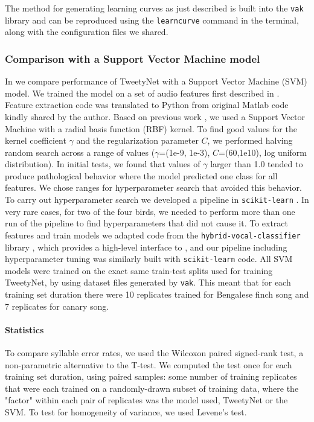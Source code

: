 \documentclass[9pt,lineno]{elife}
\begin{document}
The method for generating learning curves as just described is built into the \texttt{vak} library and 
can be reproduced using the \texttt{learncurve} command in the terminal, along with the configuration files we shared.

\subsubsection{Comparison with a Support Vector Machine model}
\label{methods:svm}
In  we compare performance of TweetyNet with a Support Vector Machine (SVM) model.
We trained the model on a set of audio features first described in \cite{tachibana2014semi}. 
Feature extraction code was translated to Python from original Matlab code kindly shared by the author. 
Based on previous work \citep{nicholson2016comparison}, 
we used a Support Vector Machine with a radial basis function (RBF) kernel. 
To find good values for the kernel coefficient $\gamma$ and the regularization parameter $C$, 
we performed halving random search across a range of values
($\gamma$=(1e-9, 1e-3), $C$=(60,1e10), log uniform distribution).
In initial tests, we found that values of $\gamma$ larger than 1.0 
tended to produce pathological behavior where the model 
predicted one class for all features.  
We chose ranges for hyperparameter search that avoided this behavior. 
To carry out hyperparameter search we developed 
a pipeline in \texttt{scikit-learn} \cite{scikit-learn,griselScikitlearnScikitlearnScikitlearn2020}.
In very rare cases, for two of the four birds, we needed to perform 
more than one run of the pipeline to find hyperparameters that did not cause it.
To extract features and train models we adapted code from the \texttt{hybrid-vocal-classifier} library 
\citep{Nicholson_hybrid-vocal-classifier_2021}, 
which provides a high-level interface to , 
and our pipeline including hyperparameter tuning was 
similarly built with \texttt{scikit-learn} code.
All SVM models were trained on the exact same train-test splits 
used for training TweetyNet, by using dataset files generated by \texttt{vak}.
This meant that for each training set duration there were 10 replicates trained 
for Bengalese finch song and 7 replicates for canary song.

\paragraph{Statistics}
To compare syllable error rates, we used the Wilcoxon paired signed-rank test, 
a non-parametric alternative to the T-test.
We computed the test once for each training set duration, 
using paired samples: 
some number of training replicates 
that were each trained on a randomly-drawn subset of training data, 
where the "factor" within each pair of replicates was the model used, TweetyNet or the SVM.
To test for homogeneity of variance, we used Levene's test.
\end{document}
